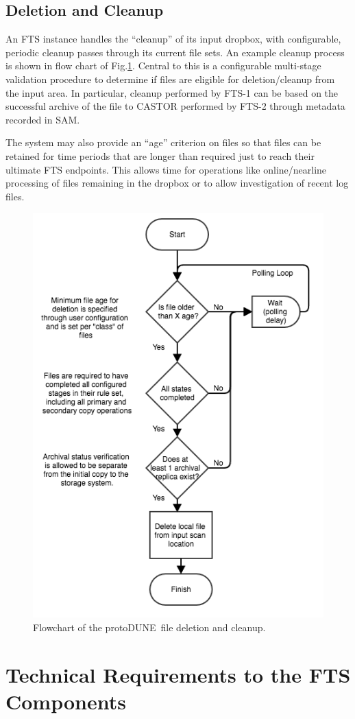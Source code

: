 \documentclass[pdftex,12pt,letter]{article}
\newcommand{\pd}{protoDUNE\ }
\begin{document}
\subsection{Deletion and Cleanup}
\label{sec:cleanup}

An FTS instance handles the ``cleanup'' of its input dropbox, with
configurable, periodic cleanup passes through its current file sets.
An example cleanup process is shown in flow chart of
Fig.\ref{fig:ftscleanup}.  Central to this is a configurable
multi-stage validation procedure to determine if files are eligible
for deletion/cleanup from the input area.  In particular, cleanup
performed by FTS-1 can be based on the successful archive of the file
to CASTOR performed by FTS-2 through metadata recorded in SAM.

The system may also provide an ``age'' criterion on files so that
files can be retained for time periods that are longer than required
just to reach their ultimate FTS endpoints.  This allows time for
operations like online/nearline processing of files remaining in the
dropbox or to allow investigation of recent log files.


\begin{figure}[tbh]
  \centering
  \includegraphics[width=0.55\linewidth]{fts_file_deletion_flowchart.png}  
  \caption{Flowchart of the \pd file deletion and cleanup.}
  \label{fig:ftscleanup}
\end{figure}


 
\section{Technical Requirements to the FTS Components}
\end{document}
